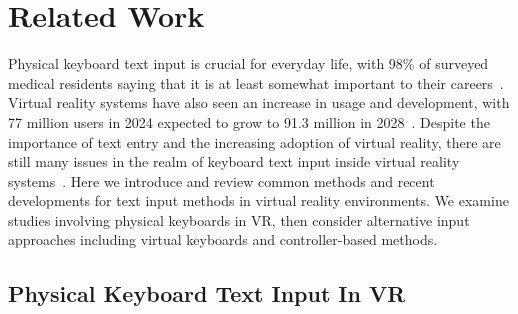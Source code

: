 \documentclass[acmlarge]{acmart}
\begin{document}
\section{Related Work}

Physical keyboard text input is crucial for everyday life, with 98\% of surveyed medical residents saying that it is at least somewhat important to their careers~\cite{Kalava2014}. Virtual reality systems have also seen an increase in usage and development, with 77 million users in 2024 expected to grow to 91.3 million in 2028~\cite{Kumar2024}. Despite the importance of text entry and the increasing adoption of virtual reality, there are still many issues in the realm of keyboard text input inside virtual reality systems~\cite{Speicher2018}. Here we introduce and review common methods and recent developments for text input methods in virtual reality environments. We examine studies involving physical keyboards in VR, then consider alternative input approaches including virtual keyboards and controller-based methods.



\subsection{Physical Keyboard Text Input In VR}
\end{document}
